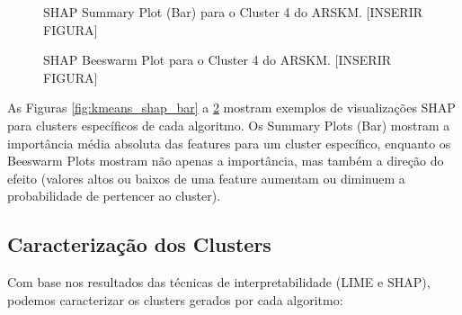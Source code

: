 \documentclass[conference]{IEEEtran}
\begin{document}
\begin{figure}[!t]
\centering
\caption{SHAP Summary Plot (Bar) para o Cluster 4 do ARSKM. [INSERIR FIGURA]}
\label{fig:arskm_shap_bar}
\end{figure}

\begin{figure}[!t]
\centering
\caption{SHAP Beeswarm Plot para o Cluster 4 do ARSKM. [INSERIR FIGURA]}
\label{fig:arskm_shap_beeswarm}
\end{figure}

As Figuras \ref{fig:kmeans_shap_bar} a \ref{fig:arskm_shap_beeswarm} mostram exemplos de visualizações SHAP para clusters específicos de cada algoritmo. Os Summary Plots (Bar) mostram a importância média absoluta das features para um cluster específico, enquanto os Beeswarm Plots mostram não apenas a importância, mas também a direção do efeito (valores altos ou baixos de uma feature aumentam ou diminuem a probabilidade de pertencer ao cluster).

\subsection{Caracterização dos Clusters}
Com base nos resultados das técnicas de interpretabilidade (LIME e SHAP), podemos caracterizar os clusters gerados por cada algoritmo:
\end{document}
